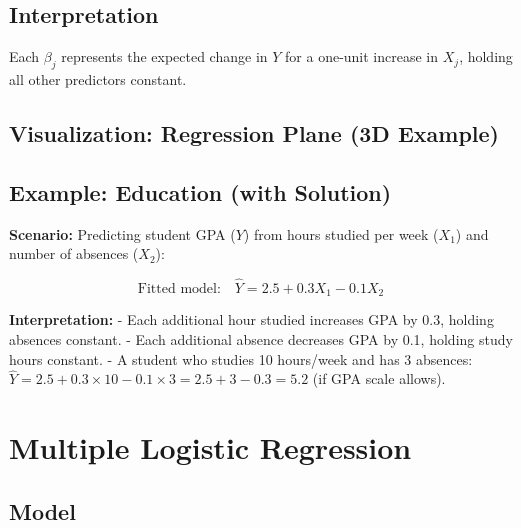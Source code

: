 \documentclass[11pt]{article}
\begin{document}
\subsection{Interpretation}

Each $\beta_j$ represents the expected change in $Y$ for a one-unit increase in $X_j$, holding all other predictors constant.

\subsection*{Visualization: Regression Plane (3D Example)}
\begin{center}
\end{center}

\subsection{Example: Education (with Solution)}

\textbf{Scenario:} Predicting student GPA ($Y$) from hours studied per week ($X_1$) and number of absences ($X_2$):

\[
\text{Fitted model:} \quad \hat{Y} = 2.5 + 0.3 X_1 - 0.1 X_2
\]

\textbf{Interpretation:}
- Each additional hour studied increases GPA by 0.3, holding absences constant.
- Each additional absence decreases GPA by 0.1, holding study hours constant.
- A student who studies 10 hours/week and has 3 absences: $\hat{Y} = 2.5 + 0.3 \times 10 - 0.1 \times 3 = 2.5 + 3 - 0.3 = 5.2$ (if GPA scale allows).

\section{Multiple Logistic Regression}

\subsection{Model}
\end{document}
